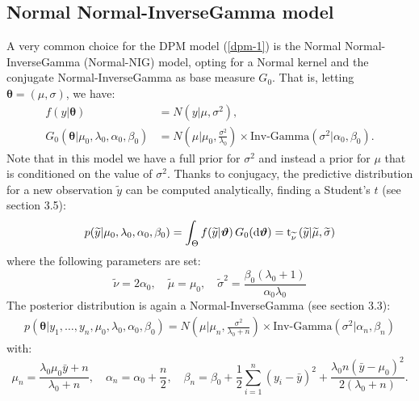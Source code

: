 \subsection{Normal Normal-InverseGamma model} \label{nnig}
A very common choice for the DPM model (\ref{dpm-1}) is the Normal Normal-InverseGamma (Normal-NIG) model, opting for a Normal kernel and the conjugate Normal-InverseGamma as base measure $G_0$. That is, letting $\boldsymbol\theta=(\mu,\sigma)$, we have:
\begin{equation}
	\begin{aligned}
		f(y|\boldsymbol\theta)&=N(y| \mu ,\sigma^2),  \\
		G_0(\boldsymbol\theta|\mu_0,\lambda_0, \alpha_0, 	\beta_0)
		&=N\left(\mu | \mu_0 ,\frac{\sigma^2} {\lambda_0}\right) \times \text{Inv-Gamma}(\sigma^2|\alpha_0, \beta_0 ).
	\end{aligned}
\end{equation}
Note that in this model we have a full prior for $\sigma^2$ and instead a prior for $\mu$ that is conditioned on the value of $\sigma^2$.
Thanks to conjugacy, the predictive distribution for a new observation $\widetilde{y}$ can be computed analytically, finding a Student's $t$ (see \cite{integral} section 3.5):
\begin{align*}
	p(\widetilde{y}|\mu_0,\lambda_0, \alpha_0, \beta_0) =
	\int_\Theta f(\widetilde{y}|\boldsymbol{\vartheta}) \, G_0(\mathrm d\boldsymbol{\vartheta}) =
	\text{t}_{\widetilde \nu}\left(\widetilde{y}|\widetilde{\mu},\widetilde{\sigma}\right)
\end{align*}
where the following parameters are set:
$$
	\widetilde{\nu}=2 \alpha_0, \quad
	\widetilde{\mu}=\mu_0, \quad
	\widetilde{\sigma}^2= \frac{\beta_0(\lambda_0+1)}{\alpha_0 \lambda_0}
$$
The posterior distribution is again a Normal-InverseGamma (see \cite{integral} section 3.3):
\begin{align*}
	p(\boldsymbol\theta|y_1,\dots,y_n,\mu_0,\lambda_0, \alpha_0, \beta_0)=N\left(\mu | \mu_n ,\frac{\sigma^2} {\lambda_0 + n}\right) \times \text{Inv-Gamma}(\sigma^2|\alpha_n, \beta_n )
\end{align*}
with:
$$
\mu_n=\frac{\lambda_0 \mu_0 \bar{y} + n}{\lambda_0 + n}, \quad \alpha_n= \alpha_0 + \frac{n}{2}, \quad \beta_n= \beta_0 + \frac{1}{2}\sum_{i=1}^{n} (y_i-\bar{y})^2 + \frac{\lambda_0 n(\bar{y}-\mu_0)^2}{2(\lambda_0 + n)}.
$$

